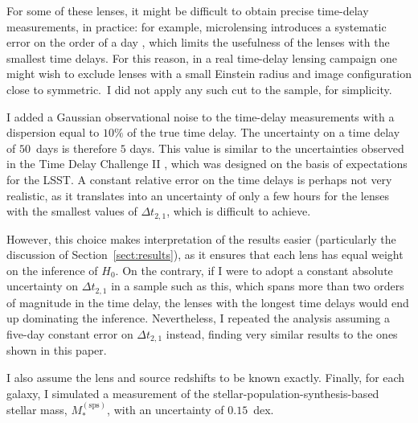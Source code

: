\documentclass{aa}
\def\msps{M_*^{\mathrm{(sps)}}}
\def\Sref#1{Section~\ref{#1}\xspace}
\begin{document}
For some of these lenses, it might be difficult to obtain precise time-delay measurements, in practice: for example, microlensing introduces a systematic error on the order of a day \citep{T+K18}, which limits the usefulness of the lenses with the smallest time delays.
For this reason, in a real time-delay lensing campaign one might wish to exclude lenses with a small Einstein radius and image configuration close to symmetric.\ I did not apply any such cut to the sample, for simplicity. 

I added a Gaussian observational noise to the time-delay measurements with a dispersion equal to $10\%$ of the true time delay. The uncertainty on a time delay of $50$~days is therefore $5$ days.
This value is similar to the uncertainties observed in the Time Delay Challenge II \citep{Lia++15}, which was designed on the basis of expectations for the LSST.
A constant relative error on the time delays is perhaps not very realistic, as it translates into an uncertainty of only a few hours for the lenses with the smallest values of $\Delta t_{2,1}$, which is difficult to achieve. 

However, this choice makes interpretation of the results easier (particularly the discussion of \Sref{sect:results}), as it ensures that each lens has equal weight on the inference of $H_0$. 
On the contrary, if I were to adopt a constant absolute uncertainty on $\Delta t_{2,1}$ in a sample such as this, which spans more than two orders of magnitude in the time delay, the lenses with the longest time delays would end up dominating the inference.
Nevertheless, I repeated the analysis assuming a five-day constant error on $\Delta t_{2,1}$ instead, finding very similar results to the ones shown in this paper.

I also assume the lens and source redshifts to be known exactly.
Finally, for each galaxy, I simulated a measurement of the stellar-population-synthesis-based stellar mass, $\msps$, with an uncertainty of $0.15$~dex.
\end{document}
